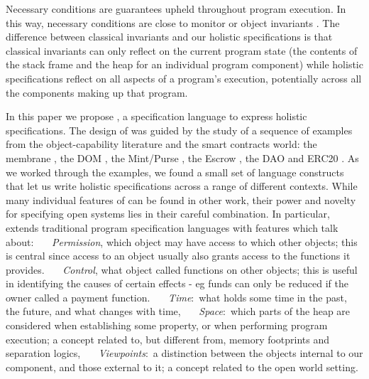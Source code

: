 Necessary conditions are guarantees upheld throughout program execution.
In this way, 
necessary conditions are close to monitor or object
invariants \cite{Hoare74,Meyer97}. The difference between 
classical invariants and our holistic specifications is that classical invariants can only reflect  on
the current program state (\ie the contents of the
stack frame and the heap for an individual program component) while
holistic specifications reflect on all aspects of a program's
execution, potentially across all the components making up that program.


In this paper we propose \Chainmail, a specification language to
express holistic specifications.
The design of \Chainmail was guided by the study of a sequence of
examples from the object-capability literature and the smart contracts world: the
membrane \cite{membranesJavascript}, the DOM \cite{dd,ddd}, the Mint/Purse \cite{MillerPhD}, the Escrow \cite{FTfJP14}, the DAO \cite{Dao,DaoBug} and
ERC20 \cite{ERC20}.  As we worked through the
examples, we found a small set of language constructs that let us
write holistic specifications across a range of different contexts.
%
While many individual features of \Chainmail can be found in other work, 
their power and novelty for specifying open systems lies in their careful combination.
In particular, \Chainmail extends 
traditional program specification languages \cite{Leavens-etal07,Meyer92} with features which talk about:
%
\ \ \textbullet \ \emph{Permission}, \ie which object may have access to which other objects; 
this is central since access to an object usually also grants access to the functions it provides.
%
\ \ \textbullet  \ \emph{Control}, \ie what  object called functions on other objects; this
 is useful in identifying the causes of certain effects - eg 
funds can only be reduced if the owner called a payment function.
%
%
\ \ \textbullet \ \emph{Time}:\   \ie  what holds some time in  the past, the future, and what changes with time,
\ \ \textbullet \ \emph{Space}:\ \ie  which parts of the heap are considered when establishing some property, or when 
performing program execution; a concept
related to, but different from, memory footprints and separation logics,
\ \ \textbullet \ \emph{Viewpoints}:\ \ie  a distinction between the objects internal to our component, and those external to
it; a concept related to the open world setting.

